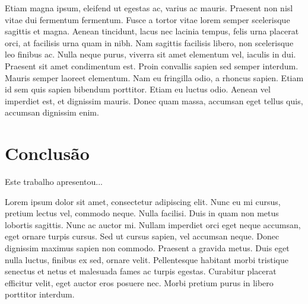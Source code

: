 \documentclass[10pt, conference, compsocconf]{IEEEtran}
\begin{document}
Etiam magna ipsum, eleifend ut egestas ac, varius ac mauris. Praesent non nisl vitae dui fermentum fermentum. Fusce a tortor vitae lorem semper scelerisque sagittis et magna. Aenean tincidunt, lacus nec lacinia tempus, felis urna placerat orci, at facilisis urna quam in nibh. Nam sagittis facilisis libero, non scelerisque leo finibus ac. Nulla neque purus, viverra sit amet elementum vel, iaculis in dui. Praesent sit amet condimentum est. Proin convallis sapien sed semper interdum. Mauris semper laoreet elementum. Nam eu fringilla odio, a rhoncus sapien. Etiam id sem quis sapien bibendum porttitor. Etiam eu luctus odio. Aenean vel imperdiet est, et dignissim mauris. Donec quam massa, accumsan eget tellus quis, accumsan dignissim enim. 

\section{Conclusão}
\label{sec:Conclusao}
Este trabalho apresentou...

Lorem ipsum dolor sit amet, consectetur adipiscing elit. Nunc eu mi cursus, pretium lectus vel, commodo neque. Nulla facilisi. Duis in quam non metus lobortis sagittis. Nunc ac auctor mi. Nullam imperdiet orci eget neque accumsan, eget ornare turpis cursus. Sed ut cursus sapien, vel accumsan neque. Donec dignissim maximus sapien non commodo. Praesent a gravida metus. Duis eget nulla luctus, finibus ex sed, ornare velit. Pellentesque habitant morbi tristique senectus et netus et malesuada fames ac turpis egestas. Curabitur placerat efficitur velit, eget auctor eros posuere nec. Morbi pretium purus in libero porttitor interdum.


%


\end{document}
